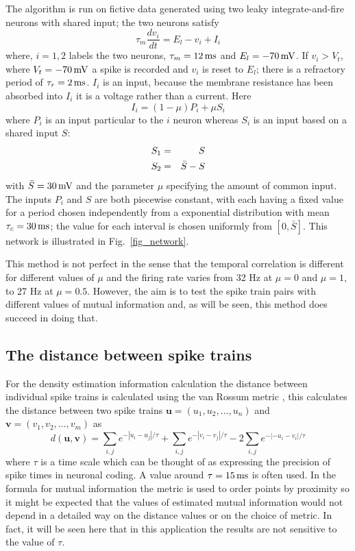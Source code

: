 \documentclass[12pt]{article}
\newcommand{\ms}{\mbox{\,ms}}
\newcommand{\mV}{\mbox{\,mV}}
\renewcommand{\u}{\mathbf{u}}
\renewcommand{\v}{\mathbf{v}}
\begin{document}
The algorithm is run on fictive data generated using two leaky
integrate-and-fire neurons with shared input; the two neurons satisfy
\begin{equation}
\tau_m \frac{dv_i}{dt}=E_l-v_i+I_i
\end{equation}
where, $i=1,2$ labels the two neurons, $\tau_m=12\ms$ and
$E_l=-70\mV$. If $v_i>V_t$, where $V_t=-70\mV$ a spike is recorded and
$v_i$ is reset to $E_l$; there is a refractory period of
$\tau_r=2\ms$. $I_i$ is an input, because the membrane resistance has
been absorbed into $I_i$ it is a voltage rather than a current. Here
\begin{equation}
I_i=(1-\mu) P_i +\mu S_i
\end{equation}
where $P_i$ is an input particular to the $i$ neuron whereas $S_i$ is an
input based on a shared input $S$:
\begin{eqnarray}
S_1&=&S\cr
S_2&=&\bar{S}-S
\end{eqnarray}
with $\bar{S}=30\mV$ and the parameter $\mu$ specifying the amount of
common input.  The inputs $P_i$ and $S$ are both piecewise constant,
with each having a fixed value for a period chosen independently from
a exponential distribution with mean $\tau_c=30\ms$; the value for
each interval is chosen uniformly from $[0,\bar{S}]$. This network is
illustrated in Fig.~\ref{fig_network}.

This method is not perfect in the sense that the temporal correlation
is different for different values of $\mu$ and the firing rate varies
from 32 Hz at $\mu=0$ and $\mu=1$, to 27 Hz at $\mu=0.5$. However, the
aim is to test the spike train pairs with different values of mutual
information and, as will be seen, this method does succeed in doing
that.

\subsection{The distance between spike trains}

For the density estimation information calculation the distance between individual
spike trains is calculated using the van Rossum metric
\citep{vanRossum2001}, this calculates the distance between two spike
trains $\u=(u_1,u_2,\ldots,u_n)$ and
$\v=(v_1,v_2,\ldots,v_m)$ as
\begin{equation}
d(\u,\v)=\sum_{i,j} e^{-|u_i-u_j|/\tau}+\sum_{i,j} e^{-|v_i-v_j|/\tau}-2\sum_{i,j} e^{-|-u_i-v_i|/\tau}
\end{equation}
where $\tau$ is a time scale which can be thought of as expressing the
precision of spike times in neuronal coding. A value around
$\tau=15\ms$ is often used. In the formula for mutual information the
metric is used to order points by proximity so it might be expected
that the values of estimated mutual information would not depend in a
detailed way on the distance values or on the choice of metric. In
fact, it will be seen here that in this application the results are
not sensitive to the value of $\tau$.
\end{document}
